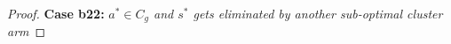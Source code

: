 \begin{proof}
\textbf{Case b22:} \textit{$a^{*}\in C_{g}$ and $s^{*}$ gets eliminated by another sub-optimal cluster arm} 


\end{proof}

